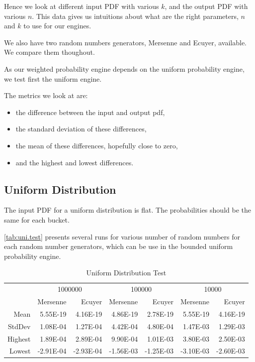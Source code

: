 \documentclass[12pt,a4paper,article]{memoir} %
\begin{document}
Hence we look at different input PDF with various $k$,
and the output PDF with various $n$. 
This data gives us intuitions about what are the right
parameters, $n$ and $k$ to use for our engines.

We also have two random numbers generators, 
Mersenne and Ecuyer, available. We compare them thoughout.

As our weighted probability engine depends on
the uniform probability engine, we test first the uniform engine.

The metrics we look at are:
\begin{itemize}
	\item the difference between the input and output pdf,
	\item the standard deviation of these differences,
	\item the mean of these differences, hopefully close to zero,
	\item and the highest and lowest differences.
\end{itemize}

\subsection{Uniform Distribution}

The input PDF for a uniform distribution is flat. The probabilities
should be the same for each bucket. 

\autoref{tab:uni.test} presents several runs for various number of random
numbers for each random number generators, which can be use in
the bounded uniform probability engine.
\begin{table}[htbp!]
  \centering \tiny
    \begin{tabular}{r|rrrrrr}
    \multicolumn{1}{r}{} & \multicolumn{2}{c}{1000000} & \multicolumn{2}{c}{100000} & \multicolumn{2}{c}{10000} \\
    \multicolumn{1}{r}{} & Mersenne & Ecuyer & Mersenne & Ecuyer & Mersenne & Ecuyer \\
\cmidrule{2-7}    Mean  & 5.55E-19 & 4.16E-19 & 4.86E-19 & 2.78E-19 & 5.55E-19 & 4.16E-19 \\
    StdDev  & 1.08E-04 & 1.27E-04 & 4.42E-04 & 4.80E-04 & 1.47E-03 & 1.29E-03 \\
    Highest  & 1.89E-04 & 2.89E-04 & 9.90E-04 & 1.01E-03 & 3.80E-03 & 2.50E-03 \\
    Lowest  & -2.91E-04 & -2.93E-04 & -1.56E-03 & -1.25E-03 & -3.10E-03 & -2.60E-03 \\
    \end{tabular}%
  \caption{Uniform Distribution Test}
  \label{tab:uni.test}%
\end{table}%
\end{document}
